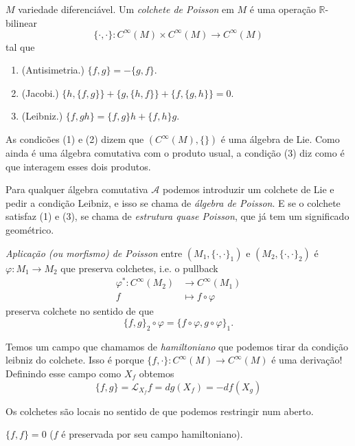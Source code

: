 \begin{definition}
\label{definition-bursztyn-poisson-bracket}
$M$ variedade diferenciável. Um
\emph{colchete de Poisson} em $M$ é uma
operação $\mathbb{R}$-bilinear
$$
\{\cdot ,\cdot \}: C^\infty(M)\times
C^\infty(M) \longrightarrow C^\infty(M)
$$
tal que
\begin{enumerate}
\item (Antisimetria.) $\{f,g\}=-\{g,f\}$.
\item (Jacobi.) $\{h,\{f,g\}\} +\{g,\{h,f\}\}
+\{f,\{g,h\}\} =0$.
\item (Leibniz.)
$\{f,gh\}=\{f,g\}h+\{f,h\}g$.
\end{enumerate}
\end{definition}
\begin{remark}
\label{remark-bursztyn-lie-algebra}
As condicões (1) e (2) dizem que
$(C^\infty(M),\{\})$ é uma álgebra de Lie.
Como ainda é uma álgebra comutativa com o
produto usual, a condição (3) diz como é que
interagem esses dois produtos.
\end{remark}
\begin{remark}
\label{remark-bursztyn-poisson-algebra}
Para qualquer álgebra comutativa
$\mathcal{A}$ podemos introduzir um colchete
de Lie e pedir a condição Leibniz, e isso se
chama de \emph{álgebra de Poisson}. E se o
colchete satisfaz (1) e (3), se chama de
\emph{estrutura quase Poisson}, que já tem um
significado geométrico.
\end{remark}
\begin{definition}
\label{definition-bursztyn-poisson-map}
\emph{Aplicação (ou morfismo) de Poisson}
entre $(M_1,\{\cdot ,\cdot \}_1)$ e $(M_2,\{
\cdot ,\cdot \}_2)$ é $\varphi:M_1 \to M_2$
que preserva colchetes, i.e. o pullback
$$
\begin{aligned}
\varphi^*: C^\infty(M_2) &\longrightarrow
C^\infty(M_1) \\
f &\longmapsto f \circ \varphi
\end{aligned}
$$
preserva colchete no sentido de que
$$
\{f,g\}_2 \circ \varphi=\{f \circ \varphi,g
\circ \varphi\}_1.
$$
\end{definition}
Temos um campo que chamamos de
\emph{hamiltoniano} que podemos tirar da
condição leibniz do colchete. Isso é porque
$\{f,\cdot \}:C^\infty(M) \to C^\infty(M)$ é
uma derivação! Definindo esse campo como
$X_f$ obtemos
$$
\{f,g\}=\mathcal{L}_{X_f}f=dg(X_f)=-df(X_g)
$$

\begin{remark}
\label{remark-bursztyn-local}
Os colchetes são locais no sentido de que
podemos restringir num aberto.
\end{remark}
\begin{remark}
\label{remark-bursztyn-casimir-zero}
$\{f,f\}=0$ ($f$ é preservada por seu campo
hamiltoniano).
\end{remark}

